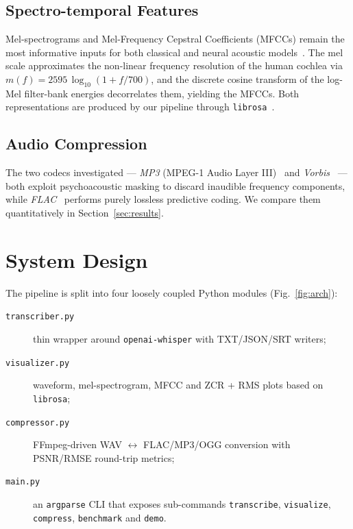 \documentclass[twocolumn,10pt,a4paper]{article}
\begin{document}
\subsection{Spectro-temporal Features}
Mel-spectrograms and Mel-Frequency Cepstral Coefficients (MFCCs) remain
the most informative inputs for both classical and neural acoustic
models~\cite{davis1980comparison}.  The mel scale approximates the
non-linear frequency resolution of the human cochlea via
$m(f) = 2595\,\log_{10}(1 + f/700)$, and the discrete cosine transform of
the log-Mel filter-bank energies decorrelates them, yielding the MFCCs.
Both representations are produced by our pipeline through
\texttt{librosa}~\cite{mcfee2015librosa}.

\subsection{Audio Compression}
The two codecs investigated --- \emph{MP3} (MPEG-1 Audio Layer III)~\cite{brandenburg1999mp3}
and \emph{Vorbis}~\cite{xiph2004vorbis} --- both exploit psychoacoustic
masking to discard inaudible frequency components, while \emph{FLAC}~\cite{coalson2008flac}
performs purely lossless predictive coding.  We compare them quantitatively
in Section~\ref{sec:results}.

\section{System Design}\label{sec:design}
The pipeline is split into four loosely coupled Python modules
(Fig.~\ref{fig:arch}):
\begin{description}
  \item[\texttt{transcriber.py}] thin wrapper around \texttt{openai-whisper}
        with TXT/JSON/SRT writers;
  \item[\texttt{visualizer.py}] waveform, mel-spectrogram, MFCC and
        ZCR + RMS plots based on \texttt{librosa};
  \item[\texttt{compressor.py}] FFmpeg-driven WAV $\leftrightarrow$
        FLAC/MP3/OGG conversion with PSNR/RMSE round-trip metrics;
  \item[\texttt{main.py}] an \texttt{argparse} CLI that exposes
        sub-commands \texttt{transcribe}, \texttt{visualize},
        \texttt{compress}, \texttt{benchmark} and \texttt{demo}.
\end{description}
\end{document}
